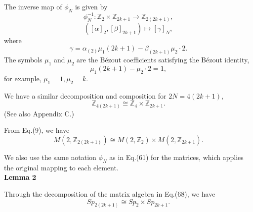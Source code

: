 \documentclass[12pt]{iopart}
\begin{document}
The inverse map of \(\phi_N\) is given by
\begin{equation}
\phi_N^{-1}: \mathbb Z_2\times\mathbb Z_{2k+1}\rightarrow\mathbb Z_{2(2k+1)},
\end{equation}
\begin{equation}
([\alpha]_2,[\beta]_{2k+1})\mapsto[\gamma]_N,
\end{equation}
where
\begin{equation}
\gamma=\alpha_{(2)}\mu_1(2k+1)-\beta_{(2k+1)}\mu_2\cdot2.
\end{equation}
The symbols \(\mu_1\) and \(\mu_2\) are the B\'ezout coefficients satisfying
the B\'ezout identity,
\begin{equation}
\mu_1(2k+1)-\mu_2\cdot2=1,
\end{equation}
for example, \(\mu_1=1,\mu_2=k\).

We have a similar decomposition and composition for \(2N=4(2k+1)\),
\begin{equation}
\mathbb Z_{4(2k+1)}\cong\mathbb Z_4\times\mathbb Z_{2k+1}.
\end{equation}
(See also Appendix C.)



From Eq.(9),
we have
\begin{equation}
M(2,\mathbb Z_{2(2k+1)})\cong M(2,\mathbb Z_2)\times M(2,\mathbb Z_{2k+1}).
\end{equation}

We also use the same notation \(\phi_N\) as in Eq.(61) for the matrices,
which applies the original mapping to each element.
\\

\noindent
{\bf Lemma 2}
\vspace{2mm}

Through the decomposition of the matrix algebra in Eq.(68), we have
\begin{equation}
Sp_{2(2k+1)}\cong Sp_2\times Sp_{2k+1}.
\end{equation}
\ \\
\end{document}
